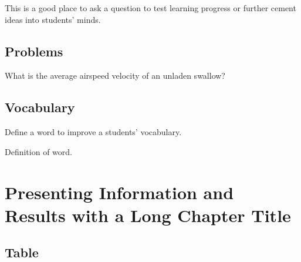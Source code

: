 \documentclass[
	11pt,
	fleqn,
	a4paper,
]{LegrandOrangeBook}
\begin{document}
\begin{exercise} %
    This is a good place to ask a question to test learning progress or further cement ideas into students' minds.
\end{exercise}


\section{Problems}

\begin{problem} %
What is the average airspeed velocity of an unladen swallow?
\end{problem}


\section{Vocabulary}

Define a word to improve a students' vocabulary.

\begin{vocabulary}[Word] %
    Definition of word.
\end{vocabulary}


\chapterspaceabove{6.25cm} %
\chapterspacebelow{7.5cm} %


\chapter{Presenting Information and Results with a Long Chapter Title}

\section{Table}
\end{document}

